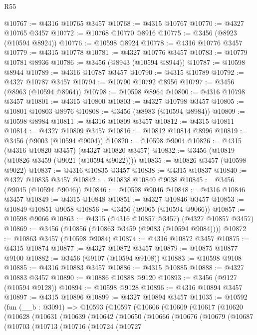 \begin{lexlean}{R55}
\begin{coremodule}
@10767 := @4316 @10765 @3457
@10768 := @4315 @10767
@10770 := @4327 @10765 @3457
@10772 := @10768 @10770 @8916
@10775 := @3456 (@8923 (@10594 @8924))
@10776 := @10598 @8924
@10778 := @4316 @10776 @3457
@10779 := @4315 @10778
@10781 := @4327 @10776 @3457
@10783 := @10779 @10781 @8936
@10786 := @3456 (@8943 (@10594 @8944))
@10787 := @10598 @8944
@10789 := @4316 @10787 @3457
@10790 := @4315 @10789
@10792 := @4327 @10787 @3457
@10794 := @10790 @10792 @8956
@10797 := @3456 (@8963 (@10594 @8964))
@10798 := @10598 @8964
@10800 := @4316 @10798 @3457
@10801 := @4315 @10800
@10803 := @4327 @10798 @3457
@10805 := @10801 @10803 @8976
@10808 := @3456 (@8983 (@10594 @8984))
@10809 := @10598 @8984
@10811 := @4316 @10809 @3457
@10812 := @4315 @10811
@10814 := @4327 @10809 @3457
@10816 := @10812 @10814 @8996
@10819 := @3456 (@9003 (@10594 @9004))
@10820 := @10598 @9004
@10826 := @4315 (@4316 @10820 @3457) (@4327 @10820 @3457)
@10832 := @3456 (@10819 (@10826 @3459 (@9021 (@10594 @9022))))
@10835 := @10826 @3457 (@10598 @9022)
@10837 := @4316 @10835 @3457
@10838 := @4315 @10837
@10840 := @4327 @10835 @3457
@10842 := @10838 @10840 @9038
@10845 := @3456 (@9045 (@10594 @9046))
@10846 := @10598 @9046
@10848 := @4316 @10846 @3457
@10849 := @4315 @10848
@10851 := @4327 @10846 @3457
@10853 := @10849 @10851 @9058
@10856 := @3456 (@9065 (@10594 @9066))
@10857 := @10598 @9066
@10863 := @4315 (@4316 @10857 @3457) (@4327 @10857 @3457)
@10869 := @3456 (@10856 (@10863 @3459 (@9083 (@10594 @9084))))
@10872 := @10863 @3457 (@10598 @9084)
@10874 := @4316 @10872 @3457
@10875 := @4315 @10874
@10877 := @4327 @10872 @3457
@10879 := @10875 @10877 @9100
@10882 := @3456 (@9107 (@10594 @9108))
@10883 := @10598 @9108
@10885 := @4316 @10883 @3457
@10886 := @4315 @10885
@10888 := @4327 @10883 @3457
@10890 := @10886 @10888 @9120
@10893 := @3456 (@9127 (@10594 @9128))
@10894 := @10598 @9128
@10896 := @4316 @10894 @3457
@10897 := @4315 @10896
@10899 := @4327 @10894 @3457
@11035 := @10592
    (fun (__b : @3091) =>
    @10593
      (@10597
        (@10606
          (@10609
            (@10617
              (@10620
                (@10628
                  (@10631
                    (@10639
                      (@10642
                        (@10650
                          (@10666
                            (@10676
                              (@10679
                                (@10687
                                  (@10703
                                    (@10713
                                      (@10716
                                        (@10724
                                          (@10727

\end{coremodule}
\end{lexlean}
